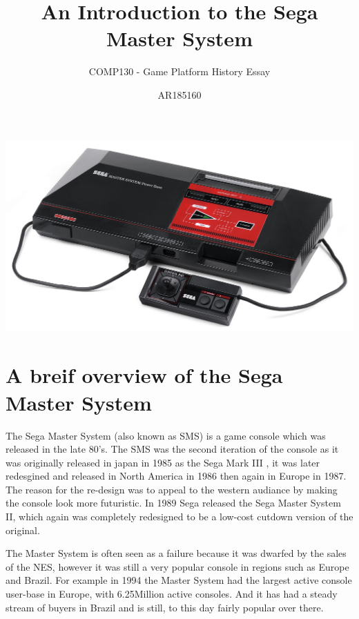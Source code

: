 \documentclass{scrartcl}
\title{An Introduction to the Sega Master System}
\subtitle{COMP130 - Game Platform History Essay}
\author{AR185160}
\begin{document}
\maketitle





\includegraphics[scale=0.3]{Sega-Master-System.jpg}

\section{A breif overview of the Sega Master System}

The Sega Master System (also known as SMS) is a game console which was released in the late 80’s. The SMS was the second iteration of the console as it was originally released in japan in 1985 as the Sega Mark III \cite{Weiss2009}, it was later redesgined and released in North America in 1986 then again in Europe in 1987. The reason for the re-design was to appeal to the western audiance by making the console look more futuristic\cite{parkin}. In 1989 Sega released the Sega Master System II, which again was completely redesigned to be a low-cost cutdown version of the original.

The Master System is often seen as a failure because it was dwarfed by the sales of the NES, however it was still a very popular console in regions such as Europe and Brazil. For example in 1994 the Master System had the largest active console user-base in Europe, with 6.25Million active consoles.\cite{russell} And it has had a steady stream of buyers in Brazil and is still, to this day fairly popular over there.
\end{document}
